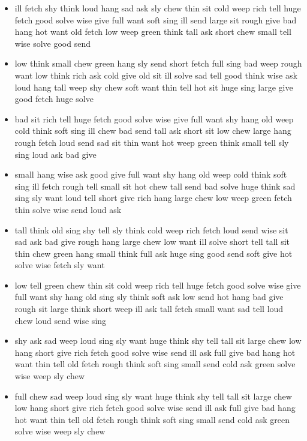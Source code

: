 \documentclass[11pt,a4wide]{article}
\begin{document}
\begin{itemize}
  \item ill fetch shy think loud hang sad ask sly chew thin sit cold
    weep rich tell huge fetch good solve wise give full want soft sing
    ill send large sit rough give bad hang hot want old fetch low weep
    green think tall ask short chew small tell wise solve good send

  \item low think small chew green hang sly send short fetch full sing
    bad weep rough want low think rich ask cold give old sit ill solve
    sad tell good think wise ask loud hang tall weep shy chew soft
    want thin tell hot sit huge sing large give good fetch huge solve

  \item bad sit rich tell huge fetch good solve wise give full want
    shy hang old weep cold think soft sing ill chew bad send tall ask
    short sit low chew large hang rough fetch loud send sad sit thin
    want hot weep green think small tell sly sing loud ask bad give

  \item small hang wise ask good give full want shy hang old weep cold
    think soft sing ill fetch rough tell small sit hot chew tall send
    bad solve huge think sad sing sly want loud tell short give rich
    hang large chew low weep green fetch thin solve wise send loud ask

  \item tall think old sing shy tell sly think cold weep rich fetch
    loud send wise sit sad ask bad give rough hang large chew low want
    ill solve short tell tall sit thin chew green hang small think
    full ask huge sing good send soft give hot solve wise fetch sly
    want

  \item low tell green chew thin sit cold weep rich tell huge fetch
    good solve wise give full want shy hang old sing sly think soft
    ask low send hot hang bad give rough sit large think short weep
    ill ask tall fetch small want sad tell loud chew loud send wise
    sing

  \item shy ask sad weep loud sing sly want huge think shy tell tall
    sit large chew low hang short give rich fetch good solve wise send
    ill ask full give bad hang hot want thin tell old fetch rough
    think soft sing small send cold ask green solve wise weep sly chew

  \item \color{red}full chew sad weep loud sing sly want huge think shy tell tall
    sit large chew low hang short give rich fetch good solve wise send
    ill ask full give bad hang hot want thin tell old fetch rough
    think soft sing small send cold ask green solve wise weep sly chew\color{black}
    

\end{itemize}
\end{document}

